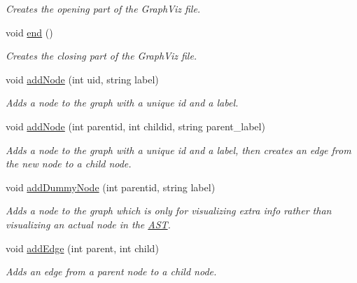\begin{DoxyCompactItemize}
\begin{DoxyCompactList}\small\item\em Creates the opening part of the Graph\-Viz file. \end{DoxyCompactList}\item 
\hypertarget{classVisualizer_a89da5b4fd09be3beac4c49067fa5cd73}{void \hyperlink{classVisualizer_a89da5b4fd09be3beac4c49067fa5cd73}{end} ()}\label{classVisualizer_a89da5b4fd09be3beac4c49067fa5cd73}

\begin{DoxyCompactList}\small\item\em Creates the closing part of the Graph\-Viz file. \end{DoxyCompactList}\item 
void \hyperlink{classVisualizer_a07370d04b5c04c37c001094d8dea1a19}{add\-Node} (int uid, string label)
\begin{DoxyCompactList}\small\item\em Adds a node to the graph with a unique id and a label. \end{DoxyCompactList}\item 
void \hyperlink{classVisualizer_a24387730bdf8579f07ef7760b5c4fe83}{add\-Node} (int parentid, int childid, string parent\-\_\-label)
\begin{DoxyCompactList}\small\item\em Adds a node to the graph with a unique id and a label, then creates an edge from the new node to a child node. \end{DoxyCompactList}\item 
void \hyperlink{classVisualizer_a135921c797363c4778a16ba0b0ee5e93}{add\-Dummy\-Node} (int parentid, string label)
\begin{DoxyCompactList}\small\item\em Adds a node to the graph which is only for visualizing extra info rather than visualizing an actual node in the \hyperlink{classAST}{A\-S\-T}. \end{DoxyCompactList}\item 
void \hyperlink{classVisualizer_a84454739e84577863200833d99de5976}{add\-Edge} (int parent, int child)
\begin{DoxyCompactList}\small\item\em Adds an edge from a parent node to a child node. \end{DoxyCompactList}\end{DoxyCompactItemize}
